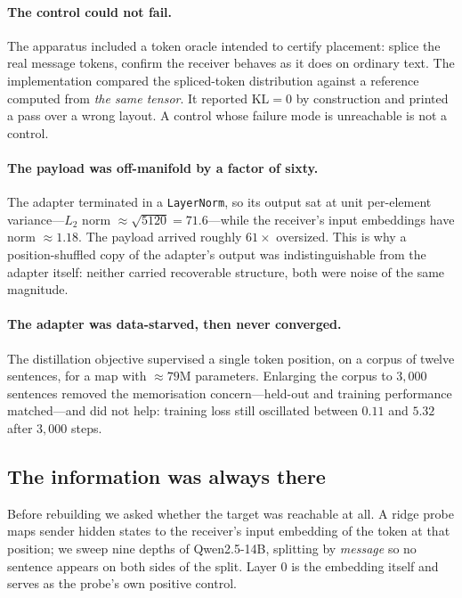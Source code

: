 \paragraph{The control could not fail.}
The apparatus included a token oracle intended to certify placement: splice the real
message tokens, confirm the receiver behaves as it does on ordinary text. The
implementation compared the spliced-token distribution against a reference computed
from \emph{the same tensor}. It reported $\mathrm{KL}=0$ by construction and printed a
pass over a wrong layout. A control whose failure mode is unreachable is not a control.

\paragraph{The payload was off-manifold by a factor of sixty.}
The adapter terminated in a \texttt{LayerNorm}, so its output sat at unit per-element
variance---$L_2$ norm $\approx\sqrt{5120}=71.6$---while the receiver's input embeddings
have norm $\approx1.18$. The payload arrived roughly $61\times$ oversized. This is why
a position-shuffled copy of the adapter's output was indistinguishable from the adapter
itself: neither carried recoverable structure, both were noise of the same magnitude.

\paragraph{The adapter was data-starved, then never converged.}
The distillation objective supervised a single token position, on a corpus of twelve
sentences, for a map with $\approx79$M parameters. Enlarging the corpus to $3{,}000$
sentences removed the memorisation concern---held-out and training performance
matched---and did not help: training loss still oscillated between $0.11$ and $5.32$
after $3{,}000$ steps.

\subsection{The information was always there}
\label{sec:latent_probe}

Before rebuilding we asked whether the target was reachable at all. A ridge probe maps
sender hidden states to the receiver's input embedding of the token at that position;
we sweep nine depths of Qwen2.5-14B, splitting by \emph{message} so no sentence appears
on both sides of the split. Layer $0$ is the embedding itself and serves as the probe's
own positive control.

